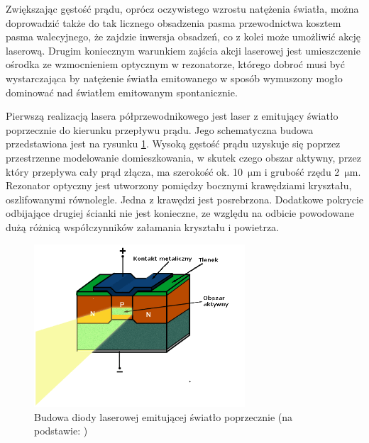\documentclass[a4paper,10pt]{article}
\begin{document}
Zwiększając gęstość prądu, oprócz oczywistego wzrostu natężenia światła, można doprowadzić także do tak licznego obsadzenia pasma przewodnictwa kosztem pasma walecyjnego, że zajdzie inwersja obsadzeń, co z kolei może umożliwić akcję laserową. Drugim koniecznym warunkiem zajścia akcji laserowej jest umieszczenie ośrodka ze wzmocnieniem optycznym w rezonatorze, którego dobroć musi być wystarczająca by natężenie światła emitowanego w sposób wymuszony mogło dominować nad światłem emitowanym spontanicznie.

Pierwszą realizacją lasera półprzewodnikowego jest laser z emitujący światło poprzecznie do kierunku przepływu prądu. Jego schematyczna budowa przedstawiona jest na rysunku \ref{rys-eel}. Wysoką gęstość prądu uzyskuje się poprzez przestrzenne modelowanie domieszkowania, w skutek czego obszar aktywny, przez który przepływa cały prąd złącza, ma szerokość ok. 10~$\mathrm{\mu m}$ i grubość rzędu 2~$\mathrm{\mu m}$. Rezonator optyczny jest utworzony pomiędzy bocznymi krawędziami kryształu, oszlifowanymi równolegle. Jedna z krawędzi jest posrebrzona. Dodatkowe pokrycie odbijające drugiej ścianki nie jest konieczne, ze względu na odbicie powodowane dużą różnicą współczynników załamania kryształu i powietrza.

\begin{figure}
\begin{center}
 \includegraphics[width=0.7\textwidth]{./obrazki/rys-eel.png}
\end{center}
\caption{Budowa diody laserowej emitującej światło poprzecznie (na podstawie: \cite{rys-laserki})}
\label{rys-eel}
\end{figure}
\end{document}
